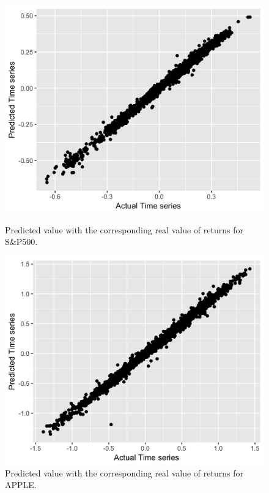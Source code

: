 \documentclass[letterpaper,12pt]{article}
\begin{document}
\begin{figure}[!tbp]
  \centering
  \begin{minipage}[t]{0.45\textwidth}
    \includegraphics[width=\textwidth]{figNNSP500.png}
    \caption{Predicted value with the corresponding real value of returns for S\&P500.\label{fig:figNNSP500}}
  \end{minipage}
  \hfill
  \begin{minipage}[t]{0.45\textwidth}
    \includegraphics[width=\textwidth]{figNNAPPLE.png}
    \caption{Predicted value with the corresponding real value of returns for APPLE.\label{fig:figNNAPPLE}}
  \end{minipage}
\end{figure}
\end{document}
